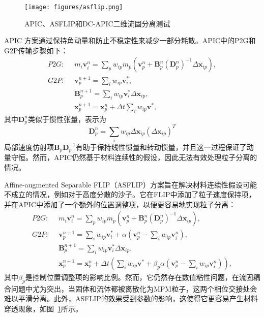 \begin{figure}
    \centering
    \texttt{[image: figures/asflip.png]}
    \caption{APIC、ASFLIP和DC-APIC二维流固分离测试}
    \label{fig:asflip}
\end{figure}

APIC \cite{jiang2015affine}方案通过保持角动量和防止不稳定性来减少一部分耗散。APIC中的P2G和G2P传输步骤如下：
\begin{equation}
    \begin{aligned}
    P2G: \;\;    
    &m_i\mathbf{v}_i^n =\sum_{p}w_{ip}m_p(\mathbf{v}_p^n + \mathbf{B}_p^n(\mathbf{D}_p^n)^{-1}\Delta\mathbf{x}_{ip}), \\
    G2P:\;\; & \mathbf{v}_p^{n+1}=\sum_iw_{ip}\mathbf{v}_i^*,\\
    &\mathbf{B}_p^{n+1} = \sum_{i}w_{ip}\mathbf{v}_i^*\Delta\mathbf{x}_{ip},\\
    &\mathbf{x}_p^{n+1}=\mathbf{x}_p^n+\Delta t\sum_iw_{ip}\mathbf{v^*},
    \end{aligned}
\end{equation}
其中$\mathbf{D}_p^n$类似于惯性张量，表示为
\begin{equation}
    \mathbf{D}_p^n=\sum_{i}w_{ip}\Delta\mathbf{x}_{ip}(\Delta\mathbf{x}_{ip})^T
\end{equation}
局部速度仿射项$\mathbf{B}_p\mathbf{D}_p^{-1}$有助于保持线性惯量和转动惯量，并且这一过程保证了动量守恒。然而，APIC仍然基于材料连续性的假设，因此无法有效处理粒子分离的情况。

Affine-augmented Separable FLIP（ASFLIP）方案\cite{fei2021revisiting}旨在解决材料连续性假设可能不成立的情况，例如对于高度分散的沙子。它在FLIP中添加了粒子速度保持项，并在APIC中添加了一个额外的位置调整项，以便更容易地实现粒子分离：
\begin{equation}
    \begin{aligned}
    P2G: \;\;    
    &m_i\mathbf{v}_i^n =\sum_{p}w_{ip}m_p(\mathbf{v}_p^n + \mathbf{B}_p^n(\mathbf{D}_p^n)^{-1}\Delta\mathbf{x}_{ip}), \\
    G2P:\;\; & \mathbf{v}_p^{n+1}=\sum_iw_{ip}\mathbf{v}_i^*+ \alpha(\mathbf{v}_p^n-\sum_iw_{ip}\mathbf{v}_i^n),\\
    &\mathbf{B}_p^{n+1} = \sum_{i}w_{ip}\mathbf{v}_i^*\Delta\mathbf{x}_{ip},\\
    &\mathbf{x}_p^{n+1}=\mathbf{x}_p^n+\Delta t(\sum_iw_{ip}\mathbf{v^*}+ \beta_p\alpha(\mathbf{v}_p^n-\sum_iw_{ip}\mathbf{v}_i^n)),
    \end{aligned}
\end{equation}
其中$\beta_p$是控制位置调整项的影响比例。然而，它仍然存在数值粘性问题，在流固耦合问题中尤为突出，当固体和流体都被离散化为MPM粒子，这两个相位交接处会难以平滑分离。此外，ASFLIP的效果受到参数的影响，这使得它更容易产生材料穿透现象，如图~\ref{fig:asflip}所示。

